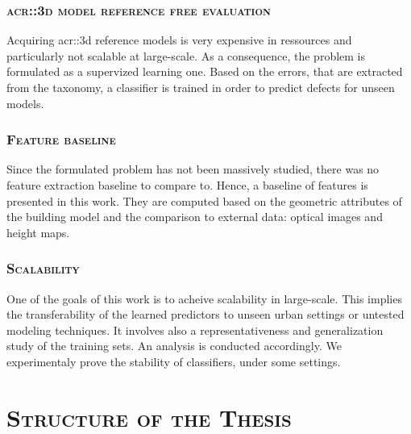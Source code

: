         \subsubsection{\textsc{\texorpdfstring{\gls*{acr::3d}}{3D} model reference free evaluation}}
            Acquiring \gls{acr::3d} reference models is very expensive in ressources and particularly not scalable at large-scale.
            As a consequence, the problem is formulated as a supervized learning one.
            Based on the errors, that are extracted from the taxonomy, a classifier is trained in order to predict defects for unseen models.

        \subsubsection{\textsc{Feature baseline}}
            Since the formulated problem has not been massively studied, there was no feature extraction baseline to compare to.
            Hence, a baseline of features is presented in this work.
            They are computed based on the geometric attributes of the building model and the comparison to external data: optical images and height maps.
        
        \subsubsection{\textsc{Scalability}}
            One of the goals of this work is to acheive scalability in large-scale.
            This implies the transferability of the learned predictors to unseen urban settings or untested modeling techniques.
            It involves also a representativeness and generalization study of the training sets.
            An analysis is conducted accordingly.
            We experimentaly prove the stability of classifiers, under some settings.

\section{\textsc{Structure of the Thesis}}
    \label{sec::introduction::structure_of_thesis}
